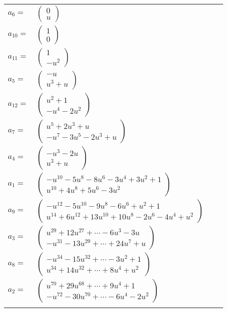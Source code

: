 \documentclass[1p]{elsarticle_modified}
\theoremstyle{definition}
\begin{document}
\begin{tabular}{m{7pt} m{180pt} m{7pt} m{180pt} }
\flushright $a_{6}=$&$\begin{pmatrix}0\\u\end{pmatrix}$ \\
\flushright $a_{10}=$&$\begin{pmatrix}1\\0\end{pmatrix}$ \\
\flushright $a_{11}=$&$\begin{pmatrix}1\\- u^2\end{pmatrix}$ \\
\flushright $a_{5}=$&$\begin{pmatrix}- u\\u^3+u\end{pmatrix}$ \\
\flushright $a_{12}=$&$\begin{pmatrix}u^2+1\\- u^4-2 u^2\end{pmatrix}$ \\
\flushright $a_{7}=$&$\begin{pmatrix}u^5+2 u^3+u\\- u^7-3 u^5-2 u^3+u\end{pmatrix}$ \\
\flushright $a_{4}=$&$\begin{pmatrix}- u^3-2 u\\u^3+u\end{pmatrix}$ \\
\flushright $a_{1}=$&$\begin{pmatrix}- u^{10}-5 u^8-8 u^6-3 u^4+3 u^2+1\\u^{10}+4 u^8+5 u^6-3 u^2\end{pmatrix}$ \\
\flushright $a_{9}=$&$\begin{pmatrix}- u^{12}-5 u^{10}-9 u^8-6 u^6+u^2+1\\u^{14}+6 u^{12}+13 u^{10}+10 u^8-2 u^6-4 u^4+u^2\end{pmatrix}$ \\
\flushright $a_{3}=$&$\begin{pmatrix}u^{29}+12 u^{27}+\cdots-6 u^3-3 u\\- u^{31}-13 u^{29}+\cdots+24 u^7+u\end{pmatrix}$ \\
\flushright $a_{8}=$&$\begin{pmatrix}- u^{34}-15 u^{32}+\cdots-3 u^2+1\\u^{34}+14 u^{32}+\cdots+8 u^4+u^2\end{pmatrix}$ \\
\flushright $a_{2}=$&$\begin{pmatrix}u^{70}+29 u^{68}+\cdots+9 u^4+1\\- u^{72}-30 u^{70}+\cdots-6 u^4-2 u^2\end{pmatrix}$\\&\end{tabular}
\end{document}
